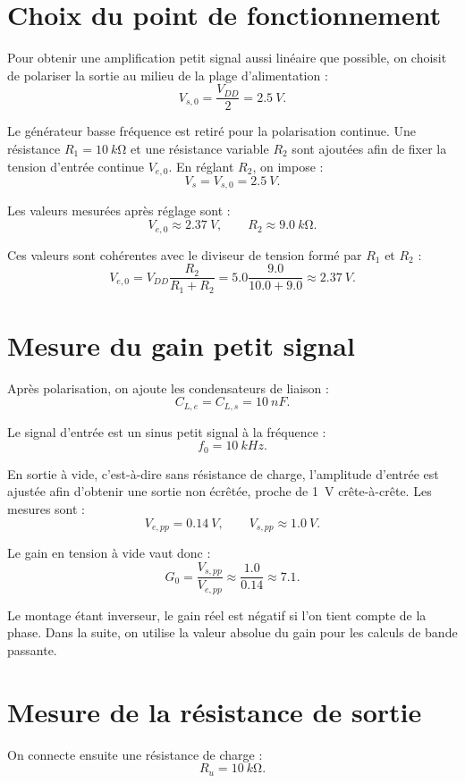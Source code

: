 \documentclass[11pt,a4paper]{article}
\begin{document}
\section{Choix du point de fonctionnement}

Pour obtenir une amplification petit signal aussi linéaire que possible, on choisit de polariser la sortie au milieu de la plage d'alimentation :
\[
V_{s,0}=\frac{V_{DD}}{2}=\SI{2.5}{V}.
\]

Le générateur basse fréquence est retiré pour la polarisation continue. Une résistance $R_1=\SI{10}{k\ohm}$ et une résistance variable $R_2$ sont ajoutées afin de fixer la tension d'entrée continue $V_{e,0}$. En réglant $R_2$, on impose :
\[
V_s=V_{s,0}=\SI{2.5}{V}.
\]

Les valeurs mesurées après réglage sont :
\[
V_{e,0}\approx \SI{2.37}{V}, \qquad R_2\approx \SI{9.0}{k\ohm}.
\]

Ces valeurs sont cohérentes avec le diviseur de tension formé par $R_1$ et $R_2$ :
\[
V_{e,0}=V_{DD}\frac{R_2}{R_1+R_2}
=5.0\frac{9.0}{10.0+9.0}
\approx \SI{2.37}{V}.
\]

\section{Mesure du gain petit signal}

Après polarisation, on ajoute les condensateurs de liaison :
\[
C_{L,e}=C_{L,s}=\SI{10}{nF}.
\]

Le signal d'entrée est un sinus petit signal à la fréquence :
\[
f_0=\SI{10}{kHz}.
\]

En sortie à vide, c'est-à-dire sans résistance de charge, l'amplitude d'entrée est ajustée afin d'obtenir une sortie non écrêtée, proche de \SI{1}{V} crête-à-crête. Les mesures sont :
\[
V_{e,pp}=\SI{0.14}{V}, \qquad V_{s,pp}\approx \SI{1.0}{V}.
\]

Le gain en tension à vide vaut donc :
\[
G_0=\frac{V_{s,pp}}{V_{e,pp}}
\approx \frac{1.0}{0.14}
\approx 7.1.
\]

Le montage étant inverseur, le gain réel est négatif si l'on tient compte de la phase. Dans la suite, on utilise la valeur absolue du gain pour les calculs de bande passante.

\section{Mesure de la résistance de sortie}

On connecte ensuite une résistance de charge :
\[
R_u=\SI{10}{k\ohm}.
\]
\end{document}
